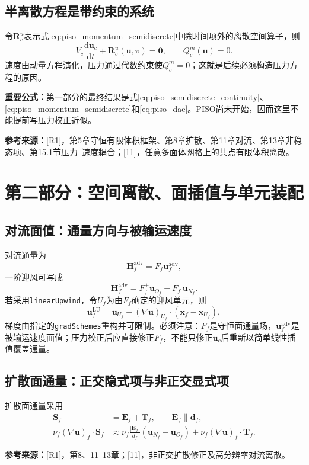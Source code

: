 \documentclass[UTF8,12pt,a4paper]{ctexart}
\numberwithin{equation}{section}
\newcommand{\Jasak}{\textnormal{[11]}}
\newcommand{\Rone}{\textnormal{[R1]}}
\newcommand{\source}[1]{\par\smallskip\noindent\colorbox{sourcebg}{%
  \parbox{0.955\linewidth}{\footnotesize\color{sourcegray}\textbf{参考来源：}#1}}\par\smallskip}
\newcommand{\keytitle}[1]{\par\smallskip\noindent\colorbox{keybg}{%
  \parbox{0.965\linewidth}{\color{keyblue}\textbf{重要公式：}#1}}\par\smallskip}
\begin{document}
\subsection{半离散方程是带约束的系统}
令$\bm R_c^u$表示式\eqref{eq:piso_momentum_semidiscrete}中除时间项外的离散空间算子，则
\begin{equation}
  \boxed{V_c\frac{\mathrm d\bm u_c}{\mathrm dt}
  +\bm R_c^u(\bm u,\pi)=\bm0,
  \qquad Q_c^m(\bm u)=0.}
  \label{eq:piso_dae}
\end{equation}
速度由动量方程演化，压力通过代数约束使$Q_c^m=0$；这就是后续必须构造压力方程的原因。
\keytitle{第一部分的最终结果是式\eqref{eq:piso_semidiscrete_continuity}、\eqref{eq:piso_momentum_semidiscrete}和\eqref{eq:piso_dae}。PISO尚未开始，因而这里不能提前写压力校正近似。}
\source{\Rone，第5章守恒有限体积框架、第8章扩散、第11章对流、第13章非稳态项、第15.1节压力--速度耦合；\Jasak，任意多面体网格上的共点有限体积离散。}

\section{第二部分：空间离散、面插值与单元装配}
\subsection{对流面值：通量方向与被输运速度}
对流通量为
\begin{equation}
  \bm H_f^{\mathrm{adv}}=F_f\bm u_f^{\mathrm{adv}},
\end{equation}
一阶迎风可写成
\begin{equation}
  \bm H_f^{\mathrm{adv}}
  =F_f^+\bm u_{O_f}+F_f^-\bm u_{N_f}.
\end{equation}
若采用\texttt{linearUpwind}，令$U_f$为由$F_f$确定的迎风单元，则
\begin{equation}
  \bm u_f^{\mathrm{LU}}
  =\bm u_{U_f}+(\nabla\bm u)_{U_f}\cdot
  (\bm x_f-\bm x_{U_f}),
\end{equation}
梯度由指定的\texttt{gradSchemes}重构并可限制。必须注意：$F_f$是守恒面通量场，$\bm u_f^{\mathrm{adv}}$是被输运速度面值；压力校正后应直接修正$F_f$，不能只修正$\bm u_c$后重新以简单线性插值覆盖通量。

\subsection{扩散面通量：正交隐式项与非正交显式项}
扩散面通量采用
\begin{align}
  \bm S_f&=\bm E_f+\bm T_f,\qquad \bm E_f\parallel\bm d_f,\\
  \nu_f(\nabla\bm u)_f\cdot\bm S_f
  &\approx \nu_f\frac{|\bm E_f|}{d_f}(\bm u_{N_f}-\bm u_{O_f})
  +\nu_f(\nabla\bm u)_f\cdot\bm T_f.
\end{align}
\source{\Rone，第8、11--13章；\Jasak，非正交扩散修正及高分辨率对流离散。}
\end{document}
